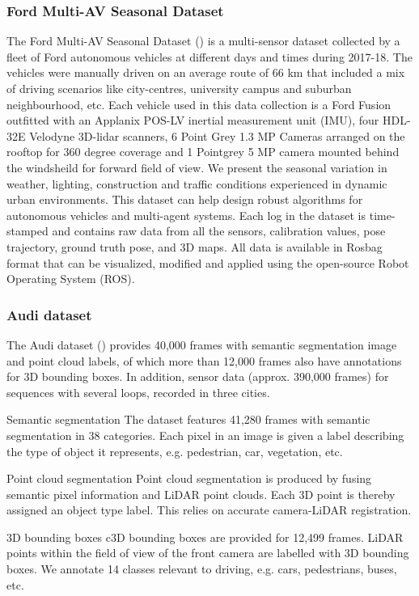 \subsubsection{Ford Multi-AV Seasonal Dataset}
The Ford Multi-AV Seasonal Dataset (\cite{agarwal2020ford}) is a multi-sensor dataset collected by a fleet of Ford autonomous vehicles at different days and times during 2017-18. The vehicles were manually driven on an average route of 66 km that included a mix of driving scenarios like city-centres, university campus and suburban neighbourhood, etc. Each vehicle used in this data collection is a Ford Fusion outfitted with an Applanix POS-LV inertial measurement unit (IMU), four HDL-32E Velodyne 3D-lidar scanners, 6 Point Grey 1.3 MP Cameras arranged on the rooftop for 360 degree coverage and 1 Pointgrey 5 MP camera mounted behind the windsheild for forward field of view. We present the seasonal variation in weather, lighting, construction and traffic conditions experienced in dynamic urban environments. This dataset can help design robust algorithms for autonomous vehicles and multi-agent systems. Each log in the dataset is time-stamped and contains raw data from all the sensors, calibration values, pose trajectory, ground truth pose, and 3D maps. All data is available in Rosbag format that can be visualized, modified and applied using the open-source Robot Operating System (ROS).

\subsubsection{Audi dataset}

The Audi dataset (\cite{AUDI}) provides 40,000 frames with semantic segmentation image and point cloud labels, of which more than 12,000 frames also have annotations for 3D bounding boxes. In addition, sensor data (approx. 390,000 frames) for sequences with several loops, recorded in three cities.

Semantic segmentation
The dataset features 41,280 frames with semantic segmentation in 38 categories. Each pixel in an image is given a label describing the type of object it represents, e.g. pedestrian, car, vegetation, etc.

Point cloud segmentation
Point cloud segmentation is produced by fusing semantic pixel information and LiDAR point clouds. Each 3D point is thereby assigned an object type label. This relies on accurate camera-LiDAR registration.

3D bounding boxes
c3D bounding boxes are provided for 12,499 frames. LiDAR points within the field of view of the front camera are labelled with 3D bounding boxes. We annotate 14 classes relevant to driving, e.g. cars, pedestrians, buses, etc.

